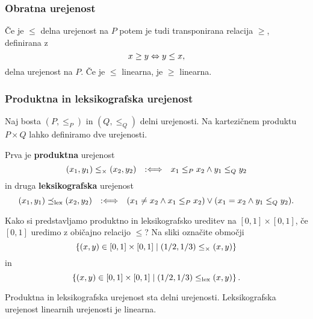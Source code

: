 \subsubsection{Obratna urejenost}

Če je $\leq$ delna urejenost na $P$ potem je tudi transponirana relacija $\geq$, definirana z
%
\begin{equation*}
    x \geq y \Leftrightarrow y \leq x,
\end{equation*}
%
delna urejenost na $P$. Če je $\leq$ linearna, je $\geq$ linearna.

\subsubsection{Produktna in leksikografska urejenost}

Naj bosta $(P, {\leq_P})$ in $(Q, {\leq_Q})$ delni urejenosti. Na kartezičnem produktu $P \times Q$ lahko definiramo dve urejenosti.

Prva je \textbf{produktna} urejenost
%
\begin{equation*}
  (x_1,y_1) \leq_{\times} (x_2,y_2) \quad {{:}{\Longleftrightarrow}}\quad x_1 \leq_P x_2 \land y_1 \leq_Q y_2
\end{equation*}
%
in druga \textbf{leksikografska} urejenost
%
\begin{equation*}
  (x_1,y_1) \preceq_\mathrm{lex} (x_2,y_2)
  \quad {{:}{\Longleftrightarrow}}\quad (x_1 \neq x_2 \land x_1 \leq_P x_2) \lor (x_1 = x_2 \land y_1 \leq_Q y_2).
\end{equation*}


\begin{naloga}
  Kako si predstavljamo produktno in leksikografsko ureditev na $[0,1] \times [0,1]$, če $[0,1]$ uredimo z običajno relacijo $\leq$? Na sliki označite območji
  \begin{equation*}
    \left\{(x,y) \in [0,1] \times [0, 1] \; \middle| \; (1/2,1/3) \leq_\times (x,y)\right\}
  \end{equation*}
  in
  \begin{equation*}
    \left\{(x,y) \in [0,1] \times [0, 1] \; \middle| \; (1/2,1/3) \leq_\mathrm{lex} (x,y)\right\}.
  \end{equation*}
\end{naloga}

\begin{izjava}
  Produktna in leksikografska urejenost sta delni urejenosti. Leksikografska urejenost linearnih urejenosti je linearna.
\end{izjava}

